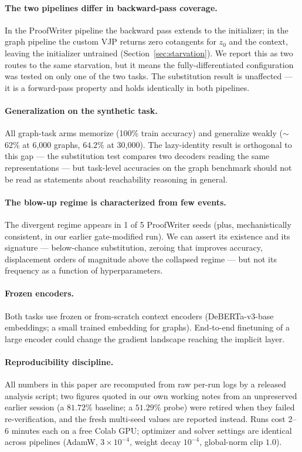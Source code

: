 \documentclass[11pt]{article}
\newcommand{\zzero}{z_{0}}
\begin{document}
\paragraph{The two pipelines differ in backward-pass coverage.} In the
ProofWriter pipeline the backward pass extends to the initializer; in
the graph pipeline the custom VJP returns zero cotangents for
$\zzero$ and the context, leaving the initializer untrained
(Section~\ref{sec:starvation}). We report this as two routes to the
same starvation, but it means the fully-differentiated configuration
was tested on only one of the two tasks. The substitution result is
unaffected --- it is a forward-pass property and holds identically in
both pipelines.

\paragraph{Generalization on the synthetic task.} All graph-task arms
memorize (100\% train accuracy) and generalize weakly ($\sim$62\% at
6{,}000 graphs, $64.2\%$ at 30{,}000). The lazy-identity result is
orthogonal to this gap --- the substitution test compares two decoders
reading the same representations --- but task-level accuracies on the
graph benchmark should not be read as statements about reachability
reasoning in general.

\paragraph{The blow-up regime is characterized from few events.} The
divergent regime appears in 1 of 5 ProofWriter seeds (plus,
mechanistically consistent, in our earlier gate-modified run). We can
assert its existence and its signature --- below-chance substitution,
zeroing that improves accuracy, displacement orders of magnitude above
the collapsed regime --- but not its frequency as a function of
hyperparameters.

\paragraph{Frozen encoders.} Both tasks use frozen or from-scratch
context encoders (DeBERTa-v3-base embeddings; a small trained
embedding for graphs). End-to-end finetuning of a large encoder could
change the gradient landscape reaching the implicit layer.

\paragraph{Reproducibility discipline.} All numbers in this paper are
recomputed from raw per-run logs by a released analysis script; two
figures quoted in our own working notes from an unpreserved earlier
session (a $81.72\%$ baseline; a $51.29\%$ probe) were retired when
they failed re-verification, and the fresh multi-seed values are
reported instead. Runs cost 2--6 minutes each on a free Colab GPU;
optimizer and solver settings are identical across pipelines
(AdamW, $3{\times}10^{-4}$, weight decay $10^{-4}$, global-norm clip
$1.0$).
\end{document}

